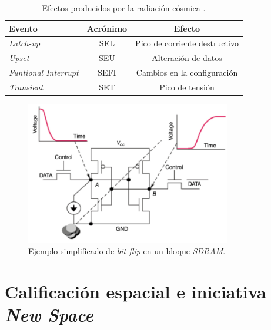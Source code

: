 
\begin{table}[h]
	\centering
	\caption[Efectos de la radiación cósmica]{Efectos producidos por la radiación cósmica \citep{WEBSITE:structure_space_radiation}.}
	\begin{tabular}{l c c}    
		\toprule
		\textbf{Evento}             & \textbf{Acrónimo} & \textbf{Efecto}\\
		\midrule
        \emph{Latch-up}             & SEL               & Pico de corriente destructivo\\		
        \emph{Upset}                & SEU               & Alteración de datos\\
        \emph{Funtional Interrupt}  & SEFI              & Cambios en la configuración\\
        \emph{Transient}            & SET               & Pico de tensión\\
		\bottomrule
		\hline
	\end{tabular}
	\label{tab:radiacion}
\end{table}

\newpage

\begin{figure}[htbp]
	\centering
	\includegraphics[width=0.8\textwidth]{./Figures/bitflip.jpg}
    \caption{Ejemplo simplificado de \emph{bit flip} en un bloque \emph{SDRAM}\protect\footnotemark.}
	\label{fig:bitflip}
\end{figure}


\section{Calificación espacial e iniciativa \emph{New Space}}
\label{sec:newspace}

